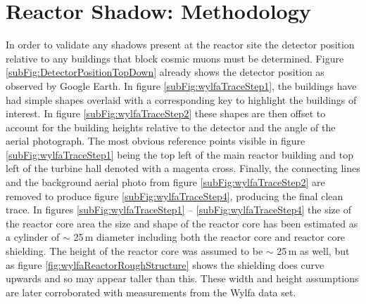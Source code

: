 
\section{Reactor Shadow: Methodology} \label{sec:ReactorShadowMethodology}
In order to validate any shadows present at the reactor site the detector position relative to any buildings that block cosmic muons must be determined. Figure \ref{subFig:DetectorPositionTopDown} already shows the detector position as observed by Google Earth. In figure \ref{subFig:wylfaTraceStep1}, the buildings have had simple shapes overlaid with a corresponding key to highlight the buildings of interest. In figure \ref{subFig:wylfaTraceStep2} these shapes are then offset to account for the building heights relative to the detector and the angle of the aerial photograph. The most obvious reference points visible in figure \ref{subFig:wylfaTraceStep1} being the top left of the main reactor building and top left of the turbine hall denoted with a magenta cross. Finally, the connecting lines and the background aerial photo from figure \ref{subFig:wylfaTraceStep2} are removed to produce figure \ref{subFig:wylfaTraceStep4}, producing the final clean trace. In figures \ref{subFig:wylfaTraceStep1}  -- \ref{subFig:wylfaTraceStep4} the size of the reactor core area the size and shape of the reactor core has been estimated as a cylinder of $\sim$ 25\,m diameter \cite{rMillsReactorSize} including both the reactor core and reactor core shielding. The height of the reactor core was assumed to be $\sim$ 25\,m as well, but as figure \ref{fig:wylfaReactorRoughStructure} shows the shielding does curve upwards and so may appear taller than this. These width and height assumptions are later corroborated with measurements from the Wylfa data set. 

